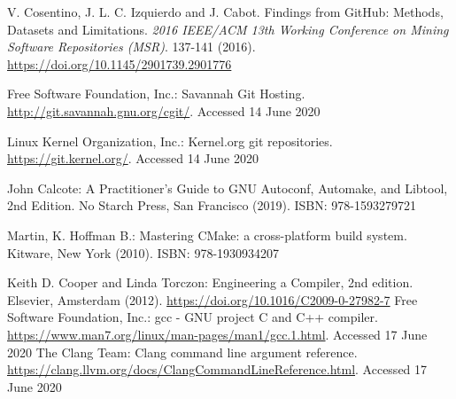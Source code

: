 \documentclass[9pt, a4paper, twocolumn]{article}
\begin{document}
\begin{thebibliography}{99}
	 V. Cosentino, J. L. C. Izquierdo and J. Cabot. Findings from GitHub: Methods, Datasets and Limitations. \textit{2016 IEEE/ACM 13th Working Conference on Mining Software Repositories (MSR)}. 137-141 (2016). \url{https://doi.org/10.1145/2901739.2901776}

	 Free Software Foundation, Inc.: Savannah Git Hosting. \url{http://git.savannah.gnu.org/cgit/}. Accessed 14 June 2020

	 Linux Kernel Organization, Inc.: Kernel.org git repositories. \url{https://git.kernel.org/}. Accessed 14 June 2020

\iffalse
	\bibitem{github-gcc} Free Software Foundation, Inc.: gcc mirror on github. \url{https://github.com/gcc-mirror/gcc}. Accessed 14 June 2020

	\bibitem{github-gnome} GNOME Foundation: GNOME Github Mirror. \url{https://github.com/GNOME}. Accessed 14 June 2020

	\bibitem{github-linux} Linus Torvalds: Linux kernel source tree. \url{https://github.com/torvalds/linux}. Accessed 14 June 2020
\fi

	 John Calcote: A Practitioner's Guide to GNU Autoconf, Automake, and Libtool, 2nd Edition. No Starch Press, San Francisco (2019). ISBN: 978-1593279721
	
	 Martin, K. Hoffman B.: Mastering CMake: a cross-platform build system. Kitware, New York (2010). ISBN: 978-1930934207

	 Keith D. Cooper and Linda Torczon: Engineering a Compiler, 2nd edition. Elsevier, Amsterdam (2012). \url{https://doi.org/10.1016/C2009-0-27982-7}
	 Free Software Foundation, Inc.: gcc - GNU project C and C++ compiler. \url{https://www.man7.org/linux/man-pages/man1/gcc.1.html}. Accessed 17 June 2020
	 The Clang Team: Clang command line argument reference. \url{https://clang.llvm.org/docs/ClangCommandLineReference.html}. Accessed 17 June 2020
\end{thebibliography}
\end{document}
